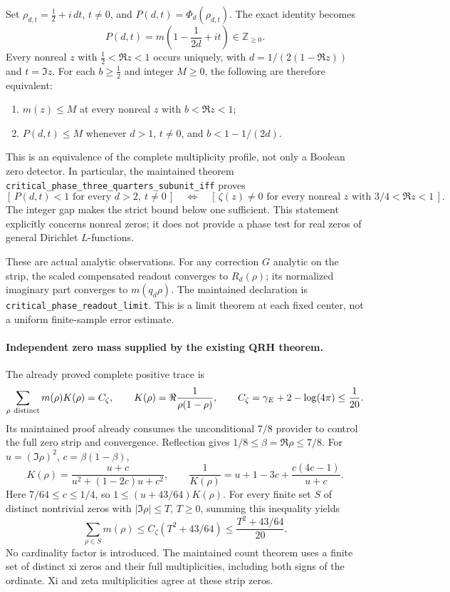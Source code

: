 Set \(\rho_{d,t}=\tfrac12+i\,dt\), \(t\ne0\), and
\(P(d,t)=\Phi_d(\rho_{d,t})\). The exact identity becomes
\begin{equation}\label{eq:critical-phase-profile}
 P(d,t)=m\left(1-\frac1{2d}+it\right)\in\mathbb Z_{\ge0}.
\end{equation}
Every nonreal \(z\) with \(\tfrac12<\Re z<1\) occurs uniquely, with
\(d=1/(2(1-\Re z))\) and \(t=\Im z\).
For each \(b\ge\tfrac12\) and integer \(M\ge0\), the following are
therefore equivalent:
\begin{enumerate}
 \item \(m(z)\le M\) at every nonreal \(z\) with \(b<\Re z<1\);
 \item \(P(d,t)\le M\) whenever \(d>1\), \(t\ne0\), and
       \(b<1-1/(2d)\).
\end{enumerate}
This is an equivalence of the complete multiplicity profile, not only
a Boolean zero detector. In particular, the maintained theorem
\texttt{critical\_phase\_three\_quarters\_subunit\_iff} proves
\[
 [\,P(d,t)<1\text{ for every }d>2,\ t\ne0\,]
 \quad\Longleftrightarrow\quad
 [\,\zeta(z)\ne0\text{ for every nonreal }
       z\text{ with }3/4<\Re z<1\,].
\]
The integer gap makes the strict bound below one sufficient.
This statement explicitly concerns nonreal zeros; it does not provide
a phase test for real zeros of general Dirichlet \(L\)-functions.

These are actual analytic observations. For any correction \(G\)
analytic on the strip, the scaled compensated readout converges to
\(R_d(\rho)\); its normalized imaginary part converges to
\(m(q_d\rho)\). The maintained declaration is
\texttt{critical\_phase\_readout\_limit}. This is a limit theorem at
each fixed center, not a uniform finite-sample error estimate.

\paragraph{Independent zero mass supplied by the existing QRH theorem.}
The already proved complete positive trace is
\[
 \sum_{\rho\ {\rm distinct}}m(\rho)K(\rho)=C_\zeta,\qquad
 K(\rho)=\Re\frac1{\rho(1-\rho)},\qquad
 C_\zeta=\gamma_E+2-\log(4\pi)\le\frac1{20}.
\]
Its maintained proof already consumes the unconditional \(7/8\)
provider to control the full zero strip and convergence.
Reflection gives \(1/8\le\beta=\Re\rho\le7/8\).
For \(u=(\Im\rho)^2\), \(c=\beta(1-\beta)\),
\[
 K(\rho)=\frac{u+c}{u^2+(1-2c)u+c^2},\qquad
 \frac1{K(\rho)}
   =u+1-3c+\frac{c(4c-1)}{u+c}.
\]
Here \(7/64\le c\le1/4\), so
\(1\le(u+43/64)K(\rho)\).
For every finite set \(S\) of distinct nontrivial zeros with
\(|\Im\rho|\le T\), \(T\ge0\), summing this inequality yields
\begin{equation}\label{eq:qrh-finite-multiplicity-budget}
 \sum_{\rho\in S}m(\rho)
 \le C_\zeta(T^2+43/64)
 \le \frac{T^2+43/64}{20}.
\end{equation}
No cardinality factor is introduced. The maintained count theorem
uses a finite set of distinct xi zeros and their full multiplicities,
including both signs of the ordinate. Xi and zeta multiplicities
agree at these strip zeros.

